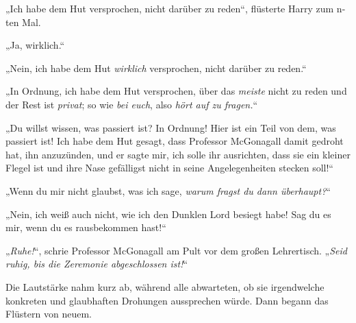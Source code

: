 „Ich habe dem Hut versprochen, nicht darüber zu reden“, flüsterte Harry zum n-ten Mal.

„Ja, wirklich.“

„Nein, ich habe dem Hut \emph{wirklich} versprochen, nicht darüber zu reden.“

„In Ordnung, ich habe dem Hut versprochen, über das \emph{meiste} nicht zu reden und der Rest ist \emph{privat}; so wie \emph{bei euch}, also \emph{hört auf zu fragen.}“

„Du willst wissen, was passiert ist? In Ordnung! Hier ist ein Teil von dem, was passiert ist! Ich habe dem Hut gesagt, dass Professor McGonagall damit gedroht hat, ihn anzuzünden, und er sagte mir, ich solle ihr ausrichten, dass sie ein kleiner Flegel ist und ihre Nase gefälligst nicht in seine Angelegenheiten stecken soll!“

„Wenn du mir nicht glaubst, was ich sage, \emph{warum fragst du dann überhaupt?}“

„Nein, ich weiß auch nicht, wie ich den Dunklen Lord besiegt habe! Sag du es mir, wenn du es rausbekommen hast!“

„\emph{Ruhe!}“, schrie Professor McGonagall am Pult vor dem großen Lehrertisch. „\emph{Seid ruhig, bis die Zeremonie abgeschlossen ist!}“

Die Lautstärke nahm kurz ab, während alle abwarteten, ob sie irgendwelche konkreten und glaubhaften Drohungen aussprechen würde. Dann begann das Flüstern von neuem.

